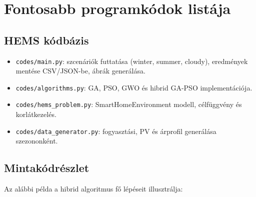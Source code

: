 \chapter{Fontosabb programkódok listája}\label{ch:progik}

\section{HEMS kódbázis}
\begin{itemize}
    \item \texttt{codes/main.py}: szcenáriók futtatása (winter, summer, cloudy), eredmények mentése CSV/JSON-be, ábrák generálása.
    \item \texttt{codes/algorithms.py}: GA, PSO, GWO és hibrid GA-PSO implementációja.
    \item \texttt{codes/hems\_problem.py}: SmartHomeEnvironment modell, célfüggvény és korlátkezelés.
    \item \texttt{codes/data\_generator.py}: fogyasztási, PV és árprofil generálása szezononként.
\end{itemize}

\section{Mintakódrészlet}
Az alábbi példa a hibrid algoritmus fő lépéseit illusztrálja:

